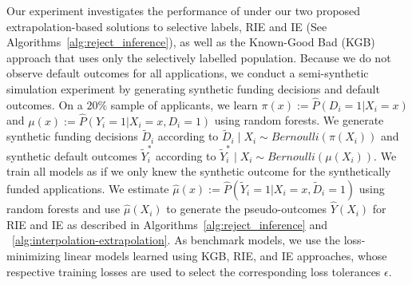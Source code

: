 \documentclass{article}
\begin{document}

Our experiment investigates the performance of \fairs under our two proposed extrapolation-based solutions to selective labels, RIE and IE (See Algorithms~\ref{alg:reject_inference}), as well as the Known-Good Bad (KGB) approach that uses only the selectively labelled population. 
Because we do not observe default outcomes for all applications, we conduct a semi-synthetic simulation experiment by generating synthetic funding decisions and default outcomes. 
On a $20\%$ sample of applicants, we learn $\pi(x) := \hat{P}(D_i = 1 | X_i = x)$ and $\mu(x) := \hat{P}(Y_i = 1 | X_i = x, D_i =1)$ using random forests. 
We generate synthetic funding decisions $\widetilde D_i$ according to $\widetilde D_i \mid X_i \sim Bernoulli(\pi(X_i))$ and synthetic default outcomes $\widetilde Y^*_i$ according to $\widetilde Y^*_i \mid X_i \sim Bernoulli(\mu(X_i))$. We train all models as if we only knew the synthetic outcome for the synthetically funded applications. We estimate $\hat \mu(x) := \hat{P}(\tilde Y_i = 1 | X_i = x, \tilde D_i =1)$ using random forests and use $\hat \mu(X_i)$ to generate the pseudo-outcomes $\hat Y(X_i)$ for RIE and IE as described in Algorithms~\ref{alg:reject_inference} and ~\ref{alg:interpolation-extrapolation}.
As benchmark models, we use the loss-minimizing linear models learned using KGB, RIE, and IE approaches, whose respective training losses are used to select the corresponding loss tolerances $\epsilon$. 
\end{document}
